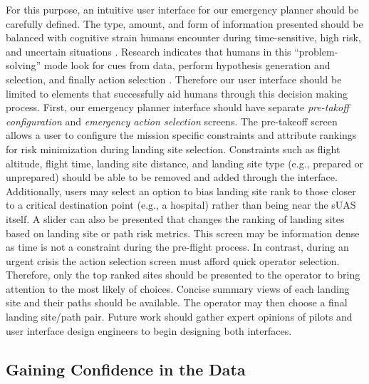 For this purpose, an intuitive user interface for our emergency planner should be carefully defined. The type, amount, and form of information presented should be balanced with cognitive strain humans encounter during time-sensitive, high risk, and uncertain situations \cite{2003_technical_review_human_error}. Research indicates that humans in this ``problem-solving'' mode look for cues from data, perform hypothesis generation and selection, and finally action selection \cite{wickens_5_1988}. Therefore our user interface should be limited to elements that successfully aid humans through this decision making process. First, our emergency planner interface should have separate \emph{pre-takoff configuration} and \emph{emergency action selection} screens. The pre-takeoff screen allows a user to configure the mission specific constraints and attribute rankings for risk minimization during landing site selection. Constraints such as flight altitude, flight time, landing site distance, and landing site type (e.g., prepared or unprepared) should be able to be removed and added through the interface. Additionally, users may select an option to bias landing site rank to those closer to a critical destination point (e.g., a hospital) rather than being near the \ac{sUAS} itself. A slider can also be presented that changes the ranking of landing sites based on landing site or path risk metrics. This screen may be information dense as time is not a constraint during the pre-flight process. In contrast, during an urgent crisis the action selection screen must afford quick operator selection. Therefore, only the top ranked sites should be presented to the operator to bring attention to the most likely of choices. Concise summary views of each landing site and their paths should be available. The operator may then choose a final landing site/path pair. Future work should gather expert opinions of pilots and user interface design engineers to begin designing both interfaces.

\subsection{Gaining Confidence in the Data}

